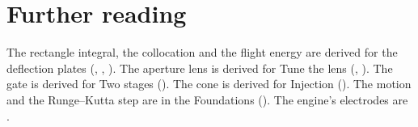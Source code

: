 \documentclass{leveldoc}
\begin{document}
\section{Further reading}\label{sec:reading}

The rectangle integral, the collocation and the flight energy are derived for
the deflection plates (,
,
). The aperture lens is derived
for Tune the lens (,
). The gate is derived for Two stages
(). The cone is derived for Injection
(). The motion and the Runge--Kutta step are in
the Foundations (). The engine's
electrodes are .

\levelfileappendix
\end{document}
